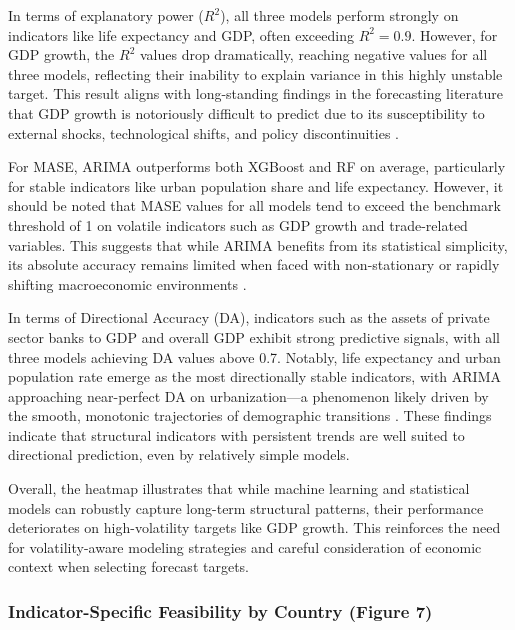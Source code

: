 \documentclass[12pt]{article}
\begin{document}
In terms of explanatory power ($R^2$), all three 
models perform strongly on indicators like life expectancy and GDP, often exceeding $R^2 = 0.9$. 
However, for GDP growth, the $R^2$ values drop dramatically, reaching negative values for all three models, reflecting their inability to explain variance in this highly unstable target. This result aligns with long-standing findings in the forecasting literature that GDP growth is notoriously difficult to predict due to its susceptibility to external shocks, technological shifts, and policy discontinuities \cite{Loungani2001, ClementsHendry2002}.

For MASE, ARIMA outperforms both XGBoost and RF on average, particularly for stable indicators like urban population share and life expectancy. However, it should be noted that MASE values for all models tend to exceed the benchmark threshold of 1 on volatile indicators such as GDP growth and trade-related variables. This suggests that while ARIMA benefits from its statistical simplicity, its absolute accuracy remains limited when faced with non-stationary or rapidly shifting macroeconomic environments \cite{Hyndman2006}.

In terms of Directional Accuracy (DA), indicators such as the assets of private sector banks to GDP and overall GDP exhibit strong predictive signals, with all three models achieving DA values above 0.7. Notably, life expectancy and urban population rate emerge as the most directionally stable indicators, with ARIMA approaching near-perfect DA on urbanization—a phenomenon likely driven by the smooth, monotonic trajectories of demographic transitions \cite{Bloom2008, Montgomery2003}. These findings indicate that structural indicators with persistent trends are well suited to directional prediction, even by relatively simple models.

Overall, the heatmap illustrates that while machine learning and statistical models can robustly capture long-term structural patterns, their performance deteriorates on high-volatility targets like GDP growth. This reinforces the need for volatility-aware modeling strategies and careful consideration of economic context when selecting forecast targets.

\subsubsection*{Indicator-Specific Feasibility by Country (Figure 7)}
\end{document}
